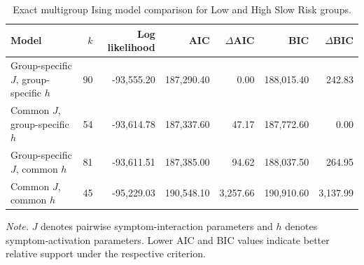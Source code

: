 \begin{table}[htbp]
\caption{Exact multigroup Ising model comparison for Low and High Slow Risk groups.}
\label{tab:ising_model_comparison}
\centering
\footnotesize
\setlength{\tabcolsep}{4pt}
\begin{tabularx}{\linewidth}{@{}Lrrrrrr@{}}
\toprule
\textbf{Model} & \textbf{$k$} & \textbf{Log likelihood} & \textbf{AIC} &
\textbf{$\Delta$AIC} & \textbf{BIC} & \textbf{$\Delta$BIC} \\
\midrule
Group-specific $J$, group-specific $h$ & 90 & -93,555.20 & 187,290.40 & 0.00 & 188,015.40 & 242.83 \\
Common $J$, group-specific $h$ & 54 & -93,614.78 & 187,337.60 & 47.17 & 187,772.60 & 0.00 \\
Group-specific $J$, common $h$ & 81 & -93,611.51 & 187,385.00 & 94.62 & 188,037.50 & 264.95 \\
Common $J$, common $h$ & 45 & -95,229.03 & 190,548.10 & 3,257.66 & 190,910.60 & 3,137.99 \\
\bottomrule
\end{tabularx}
\vspace{3pt}
\footnotesize
\emph{Note.} $J$ denotes pairwise symptom-interaction parameters and
$h$ denotes symptom-activation parameters. Lower AIC and BIC values
indicate better relative support under the respective criterion.
\end{table}
